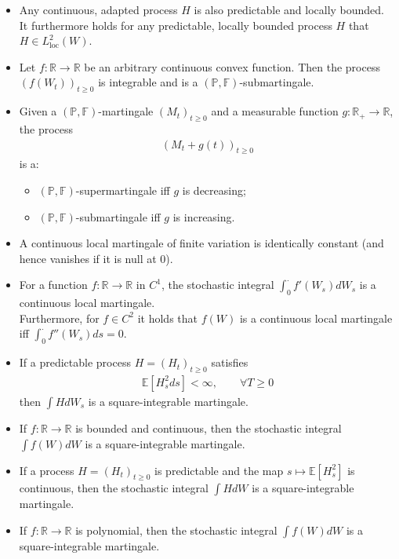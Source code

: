 \documentclass[a4paper,landscape,8pt,fleqn]{scrartcl}
\begin{document}
\begin{multicols*}{3}
\begin{itemize}
\item Any continuous, adapted process $H$ is also predictable and locally bounded. \\
It furthermore holds for any predictable, locally bounded process $H$ that $H \in L_\text{loc}^2(W)$.
\item Let $f: \mathbb{R} \to \mathbb{R}$ be an arbitrary continuous convex function. Then the process $(f(W_t))_{t \geq 0}$ is integrable and is a $(\mathbb{P},\mathbb{F})$-submartingale.
\item Given a $(\mathbb{P},\mathbb{F})$-martingale $(M_t)_{t \geq 0}$ and a measurable function $g: \mathbb{R}_+ \to \mathbb{R}$, the process
\begin{align*}
(M_t + g(t))_{t \geq 0}
\end{align*}
is a:
\begin{itemize}
\item $(\mathbb{P},\mathbb{F})$-supermartingale iff $g$ is decreasing;
\item $(\mathbb{P},\mathbb{F})$-submartingale iff $g$ is increasing.
\end{itemize}
\item A continuous local martingale of finite variation is identically constant (and hence vanishes if it is null at 0).
\item For a function $f: \mathbb{R} \to \mathbb{R}$ in $C^1$, the stochastic integral $\int_0^\cdot f'(W_s) dW_s$ is a continuous local martingale. \\
Furthermore, for $f \in C^2$ it holds that $f(W)$ is a continuous local martingale iff $\int_0^\cdot f''(W_s) ds = 0$.
\item If a predictable process $H = (H_t)_{t \geq 0}$ satisfies
\begin{align*}
\mathbb{E} \left[ H_s^2 ds \right] < \infty, \qquad \forall T \geq 0
\end{align*}
then $\int H dW_s$ is a square-integrable martingale.
\item If $f: \mathbb{R} \to \mathbb{R}$ is bounded and continuous, then the stochastic integral $\int f(W) dW$ is a square-integrable martingale.
\item If a process $H = (H_t)_{t \geq 0}$ is predictable and the map $s \mapsto \mathbb{E}[H_s^2]$ is continuous, then the stochastic integral $\int H dW$ is a square-integrable martingale.
\item If $f: \mathbb{R} \to \mathbb{R}$ is polynomial, then the stochastic integral $\int f(W) dW$ is a square-integrable martingale.
\end{itemize}


\end{multicols*}
\end{document}
